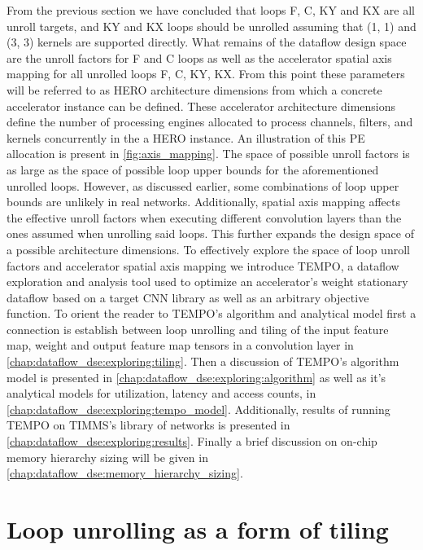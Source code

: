 From the previous section we have concluded that loops F, C, KY and KX are all
unroll targets, and KY and KX loops should be unrolled assuming that (1, 1) and
(3, 3) kernels are supported directly. What remains of the dataflow design space
are the unroll factors for F and C loops as well as the accelerator spatial axis
mapping for all unrolled loops F, C, KY, KX. From this point these parameters
will be referred to as HERO architecture dimensions from which a concrete
accelerator instance can be defined. These accelerator architecture dimensions
define the number of processing engines allocated to process channels, filters,
and kernels concurrently in the a HERO instance. An illustration of this \ac{PE}
allocation is present in \autoref{fig:axis_mapping}. The space of possible
unroll factors is as large as the space of possible loop upper bounds for the
aforementioned unrolled loops. However, as discussed earlier, some combinations
of loop upper bounds are unlikely in real networks. Additionally, spatial axis
mapping affects the effective unroll factors when executing different
convolution layers than the ones assumed when unrolling said loops. This further
expands the design space of a possible architecture dimensions. To effectively
explore the space of loop unroll factors and accelerator spatial axis mapping we
introduce \ac{TEMPO}, a dataflow exploration and analysis tool used to optimize
an accelerator's weight stationary dataflow based on a target CNN library as
well as an arbitrary objective function. To orient the reader to TEMPO's
algorithm and analytical model first a connection is establish between loop
unrolling and tiling of the input feature map, weight and output feature map
tensors in a convolution layer in \autoref{chap:dataflow_dse:exploring:tiling}. 
Then a discussion of \ac{TEMPO}'s algorithm
model is presented in \autoref{chap:dataflow_dse:exploring:algorithm} as well as
it's analytical models for utilization, latency and access counts, in
\autoref{chap:dataflow_dse:exploring:tempo_model}. Additionally, results of
running \ac{TEMPO} on TIMMS's library of networks is presented in
\autoref{chap:dataflow_dse:exploring:results}. Finally a brief discussion on
on-chip memory hierarchy sizing will be given in
\autoref{chap:dataflow_dse:memory_hierarchy_sizing}. 


\section{Loop unrolling as a form of tiling}
\label{chap:dataflow_dse:exploring:tiling}

